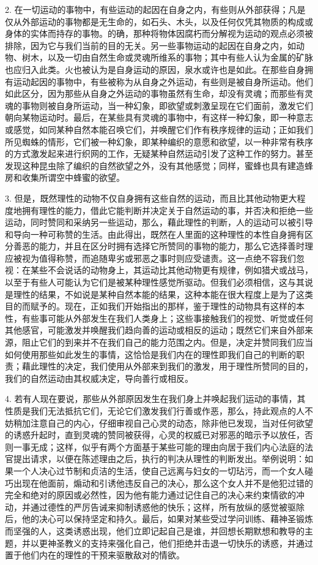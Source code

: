 2. 在一切运动的事物中，有些运动的起因在自身之内，有些则从外部获得；凡是仅从外部运动的事物都是无生命的，如石头、木头，以及任何仅凭其物质的构成或身体的实体而持存的事物。的确，那种将物体因腐朽而分解视为运动的观点必须被排除，因为它与我们当前的目的无关。另一些事物运动的起因在自身之内，如动物、树木，以及一切由自然生命或灵魂所维系的事物；其中有些人认为金属的矿脉也应归入此类。火也被认为是自身运动的原因，泉水或许也是如此。在那些自身拥有运动起因的事物中，有些被称为从自身之外运动，有些则是被自身所运动。他们如此区分，因为那些从自身之外运动的事物虽然有生命，却没有灵魂；而那些有灵魂的事物则被自身所运动，当一种幻象，即欲望或刺激呈现在它们面前，激发它们朝向某物运动时。最后，在某些具有灵魂的事物中，有这样一种幻象，即一种意志或感觉，如同某种自然本能召唤它们，并唤醒它们作有秩序规律的运动；正如我们所见蜘蛛的情形，它们被一种幻象，即某种编织的意愿和欲望，以一种非常有秩序的方式激发起来进行织网的工作，无疑某种自然运动引发了这种工作的努力。甚至发现这种昆虫除了编织的自然欲望之外，没有其他感觉；同样，蜜蜂也具有建造蜂房和收集所谓空中蜂蜜的欲望。\par

3. 但是，既然理性的动物不仅自身拥有这些自然的运动，而且比其他动物更大程度地拥有理性的能力，借此它能判断并决定关于自然运动的事，并否决和拒绝一些运动，同时赞同和采纳另一些运动，那么，藉此理性的判断，人的运动可以被引导和导向一种可称赞的生活。由此得出，既然在人里面的这种理性的本性自身拥有区分善恶的能力，并且在区分时拥有选择它所赞同的事物的能力，那么它选择善时理应被视为值得称赞，而追随卑劣或邪恶之事时则应受谴责。这一点绝不容我们忽视：在某些不会说话的动物身上，其运动比其他动物更有规律，例如猎犬或战马，以至于有些人可能认为它们是被某种理性感觉所驱动。但我们必须相信，这与其说是理性的结果，不如说是某种自然本能的结果，这种本能在很大程度上是为了这类目的而赋予的。现在，正如我们开始指出的那样，鉴于理性的动物具有这样的本性，有些事可能从外部发生在我们人类身上；这些事接触我们的视觉、听觉或任何其他感官，可能激发并唤醒我们趋向善的运动或相反的运动；既然它们来自外部来源，阻止它们的到来并不在我们自己的能力范围之内。但是，决定并赞同我们应当如何使用那些如此发生的事情，这恰恰是我们内在的理性即我们自己的判断的职责；藉此理性的决定，我们使用从外部来到我们的激发，用于理性所赞同的目的，我们的自然运动由其权威决定，导向善行或相反。\par

4. 若有人现在要说，那些从外部原因发生在我们身上并唤起我们运动的事情，其性质是我们无法抵抗它们，无论它们激发我们行善或作恶，那么，持此观点的人不妨稍加注意自己的内心，仔细审视自己心灵的动态，除非他已发现，当对任何欲望的诱惑升起时，直到灵魂的赞同被获得，心灵的权威已对邪恶的暗示予以放任，否则一事无成；这样，似乎有两个方面基于某些可能的理由向居于我们内心法庭的法官提出请求，以便在陈述理由之后，执行的判决从理性的判断发出。举例说明：如果一个人决心过节制和贞洁的生活，使自己远离与妇女的一切玷污，而一个女人碰巧出现在他面前，煽动和引诱他违反自己的决心，那么这个女人并不是他犯过错的完全和绝对的原因或必然性，因为他有能力通过记住自己的决心来约束情欲的冲动，并通过德性的严厉告诫来抑制诱惑他的快乐；这样，所有放纵的感觉被驱除后，他的决心可以保持坚定和持久。最后，如果对某些受过学问训练、藉神圣锻炼而坚强的人，这类诱惑出现，他们立即记起自己是谁，并回想长期默想和教导的主题，并以更神圣教义的支持来强化自己，他们拒绝并击退一切快乐的诱惑，并通过置于他们内在的理性的干预来驱散敌对的情欲。\par

